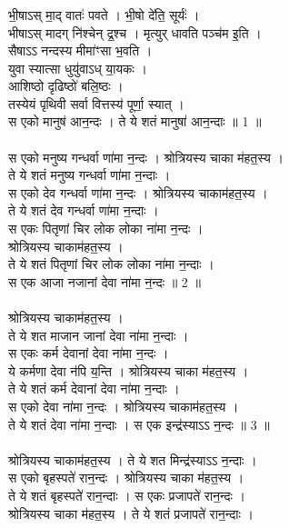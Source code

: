 \subsubsection{}
भी॒षाऽस् मा॒द् वातः॑ पवते । भी॒षो दे॑ति॒ सूर्यः॑ ।\\
भीषाऽस् मादग् नि॑श्चेन् द्र॒श्च । मृत्युर् धावति पञ्च॑म इ॒ति ।\\
सैषाऽऽ नन्दस्य मीमा॑ꣳसा भ॒वति ।\\
युवा स्यात्सा धुयु॑वाऽध् या॒यकः ।\\
आशिष्ठो दृढिष्ठो॑ बलि॒ष्ठः ।\\
तस्येयं पृथिवी सर्वा वित्तस्य॑ पूर्णा॒ स्यात् ।\\
स एको मानुष॑ आन॒न्दः । ते ये शतं मानुषा॑ आन॒न्दाः ॥ 1 ॥\\
\\
स एको मनुष्य गन्धर्वा णा॑मा न॒न्दः । श्रोत्रियस्य चाका म॑हत॒स्य ।\\
ते ये शतं मनुष्य गन्धर्वा णा॑मा न॒न्दाः ।\\
स एको देव गन्धर्वा णा॑मा न॒न्दः । श्रोत्रियस्य चाकाम॑हत॒स्य ।\\
ते ये शतं देव गन्धर्वा णा॑मा न॒न्दाः ।\\
स एकः पितृणां चिर लोक लोका ना॑मा न॒न्दः ।\\
श्रोत्रियस्य चाकाम॑हत॒स्य ।\\
ते ये शतं पितृणां चिर लोक लोका ना॑मा न॒न्दाः ।\\
स एक आजा नजानां देवा ना॑मा न॒न्दः ॥ 2 ॥\\
\\
श्रोत्रियस्य चाकाम॑हत॒स्य ।\\
ते ये शत माजान जानां देवा ना॑मा न॒न्दाः ।\\
स एकः कर्म देवानां देवा ना॑मा न॒न्दः ।\\
ये कर्मणा देवा न॑पि य॒न्ति । श्रोत्रियस्य चाका म॑हत॒स्य ।\\
ते ये शतं कर्म देवानां देवा ना॑मा न॒न्दाः ।\\
स एको देवा ना॑मा न॒न्दः । श्रोत्रियस्य चाकाम॑हत॒स्य ।\\
ते ये शतं देवा ना॑मा न॒न्दाः । स एक इन्द्र॑स्याऽऽ न॒न्दः ॥ 3 ॥\\
\\
श्रोत्रियस्य चाकाम॑हत॒स्य । ते ये शत मिन्द्र॑स्याऽऽ न॒न्दाः ।\\
स एको बृहस्पते॑ रान॒न्दः । श्रोत्रियस्य चाका म॑हत॒स्य ।\\
ते ये शतं बृहस्पते॑ रान॒न्दाः । स एकः प्रजापते॑ रान॒न्दः ।\\
श्रोत्रियस्य चाका म॑हत॒स्य । ते ये शतं प्रजापते॑ रान॒न्दाः ।\\
